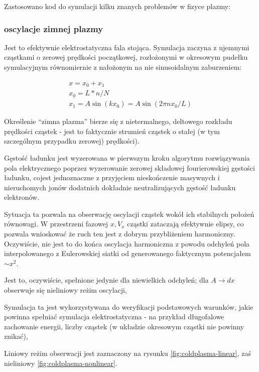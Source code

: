     Zastosowano kod do symulacji kilku znanych problemów w fizyce plazmy:
    \subsubsection{oscylacje zimnej plazmy}
    Jest to efektywnie elektrostatyczna fala stojąca. Symulacja zaczyna z ujemnymi cząstkami
o zerowej prędkości początkowej, rozłożonymi w okresowym pudełku symulacyjnym
równomiernie z nałożonym na nie sinusoidalnym zaburzeniem:

\begin{align}
x = x_0 + x_1\\
x_0 = L * n / N\\
x_1 = A  \sin(k x_0)=A \sin(2 \pi n x_0 / L)
\end{align}

Określenie ``zimna plazma'' bierze się z nietermalnego, deltowego
rozkładu prędkości cząstek - jest to faktycznie strumień cząstek o stałej
(w tym szczególnym przypadku zerowej) prędkości).

Gęstość ładunku jest wyzerowana w pierwszym kroku algorytmu rozwiązywania pola elektrycznego
poprzez wyzerowanie zerowej składowej fourierowskiej gęstości ładunku, cojest jednoznaczne
z przyjęciem nieskończenie masywnych i nieruchomych jonów dodatnich dokładnie neutralizujących gęstość
ładunku elektronów.

Sytuacja ta
pozwala na obserwację oscylacji cząstek wokół ich stabilnych położeń
równowagi. W przestrzeni fazowej $x, V_x$ cząstki zataczają efektywnie
elipsy, co pozwala wnioskować że ruch ten jest z dobrym przybliżeniem harmoniczny.
Oczywiście, nie jest to do końca oscylacja harmoniczna z powodu odchyleń pola interpolowanego
z Eulerowskiej siatki od generowanego faktycznym potencjałem $ \sim x^2 $.

Jest to, oczywiście, spełnione jedynie dla niewielkich odchyleń; dla $A \to
dx$  obserwuje się nieliniowy reżim oscylacji, 

Symulacja ta jest wykorzystywana do weryfikacji podstawowych warunków, jakie powinna spełniać
symulacja elektrostatyczna - na przykład długofalowe zachowanie energii, liczby cząstek (w układzie okresowym cząstki nie powinny
znikać), %

Liniowy reżim obserwacji jest zaznaczony na rysunku
\ref{fig:coldplasma-linear}, zaś nieliniowy \ref{fig:coldplasma-nonlinear}.

